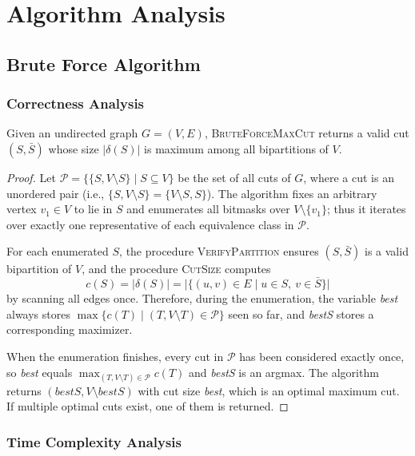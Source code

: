\documentclass[12pt]{article}
\begin{document}
\section{Algorithm Analysis}
\subsection{Brute Force Algorithm}
\subsubsection{Correctness Analysis}
\begin{theorem}
Given an undirected graph $G=(V,E)$, \textsc{BruteForceMaxCut} returns a valid cut $(S,\bar S)$ whose size $|\delta(S)|$ is maximum among all bipartitions of $V$.
\end{theorem}

\begin{proof}

Let $\mathcal{P} = \{\{S, V\setminus S\} \mid S \subseteq V\}$ be the set of all cuts of $G$, where a cut is an unordered pair (i.e., $\{S, V\setminus S\} = \{V\setminus S, S\}$). The algorithm fixes an arbitrary vertex $v_1 \in V$ to lie in $S$ and enumerates all bitmasks over $V\setminus\{v_1\}$; thus it iterates over exactly one representative of each equivalence class in $\mathcal{P}$.

For each enumerated $S$, the procedure \textsc{VerifyPartition} ensures $(S,\bar S)$ is a valid bipartition of $V$, and the procedure \textsc{CutSize} computes
\[
c(S)=|\delta(S)|=\big|\{(u,v)\in E \mid u\in S,\ v\in \bar S\}\big|
\]
by scanning all edges once. Therefore, during the enumeration, the variable \textit{best} always stores $\max\{c(T)\mid (T,V\setminus T)\in\mathcal{P}\}$ seen so far, and \textit{bestS} stores a corresponding maximizer.

When the enumeration finishes, every cut in $\mathcal{P}$ has been considered exactly once, so \textit{best} equals $\max_{(T,V\setminus T)\in\mathcal{P}} c(T)$ and \textit{bestS} is an argmax. The algorithm returns $(\textit{bestS}, V\setminus \textit{bestS})$ with cut size \textit{best}, which is an optimal maximum cut. If multiple optimal cuts exist, one of them is returned.
\end{proof}
\subsubsection{Time Complexity Analysis}
\end{document}
